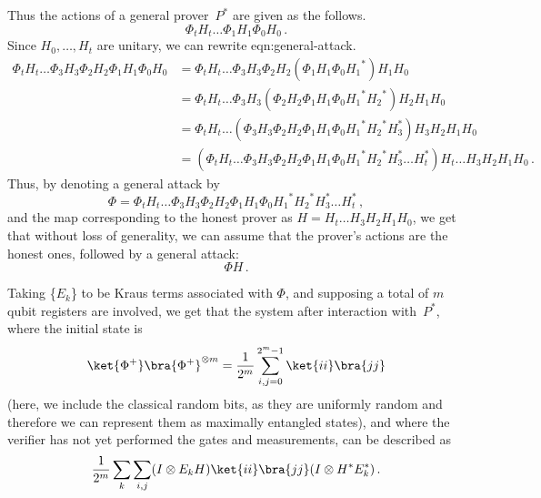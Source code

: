 \documentclass{toc}
\newcommand{\ketbra}[2]{\ket{#1}\bra{#2}}			%
\newcommand{\egoketbra}[1]{\ketbra{#1}{#1}}			%
\begin{document}
Thus the actions of a general prover~$P^*$ %
are given as %
the follows.  %
%
 \begin{equation}
 \label{eqn:general-attack}
\Phi_t  H_t\ldots\Phi_1   H_1 \Phi_0H_0\,.
 \end{equation}
 Since $H_0, \ldots ,H_t$ are unitary, we can
%
rewrite   %
  {eqn:general-attack}. 
%
%
\begin{align}
 \Phi_t  H_t\ldots  \Phi_3   H_3 \Phi_2   H_2 \Phi_1   H_1 \Phi_0H_0 &=
  \Phi_t  H_t\ldots  \Phi_3   H_3 \Phi_2   H_2 (\Phi_1   H_1 \Phi_0 {H_1}^*) H_1 H_0\\
&=    \Phi_t  H_t\ldots  \Phi_3   H_3 (\Phi_2   H_2 \Phi_1   H_1 \Phi_0 {H_1}^* {H_2}^*)H_2  H_1 H_0\\
&=    \Phi_t  H_t\ldots ( \Phi_3   H_3 \Phi_2   H_2 \Phi_1   H_1 \Phi_0 {H_1}^* {H_2}^* H_3^*)H_3 H_2  H_1 H_0\\
&=  (\Phi_t  H_t\ldots  \Phi_3   H_3 \Phi_2   H_2 \Phi_1   H_1 \Phi_0 {H_1}^* {H_2}^* H_3^* \ldots  H_t^*) H_t  \ldots  H_3   H_2 H_1 H_0\,.
\end{align}
Thus, by denoting a general attack by
\begin{equation}
  \Phi = \Phi_t  H_t\ldots  \Phi_3   H_3 \Phi_2   H_2 \Phi_1   H_1 \Phi_0 {H_1}^* {H_2}^* H_3^* \ldots  H_t^*\,,
\end{equation}
and the map corresponding to the honest prover as
$H = H_t \ldots H_3 H_2 H_1 H_0$, we get that without loss of
generality, we can assume that the prover's actions are the honest
ones, followed by a general attack:
%
\begin{equation}
 \label{eqn:general-attack-simple}
\Phi H\,.
\end{equation}

Taking \{$E_k$\} to be  Kraus terms associated with $\Phi$, and supposing a total of $m$ qubit registers are involved,
we get that the system after interaction with~$P^*$, where the initial state is
\begin{equation}
  \egoketbra{\Phi^+}^{\otimes m} =  \frac{1}{2^m}\sum_{i,j=0}^{2^m-1}\ketbra{ii}{jj}
\end{equation}
(here, we include the classical random bits, as they are uniformly
random and therefore we can represent them as maximally entangled
states), and where the verifier has not yet performed the gates and
measurements, can be described as%
%
\begin{equation}
\label{eqn:attack-on-EPR-I}
  \frac{1}{2^m}\sum_k  \sum_{i,j}  (I\otimes E_k H ) \ketbra{ii}{jj} (I\otimes H^* E_k^*)\,.
\end{equation}
\end{document}
